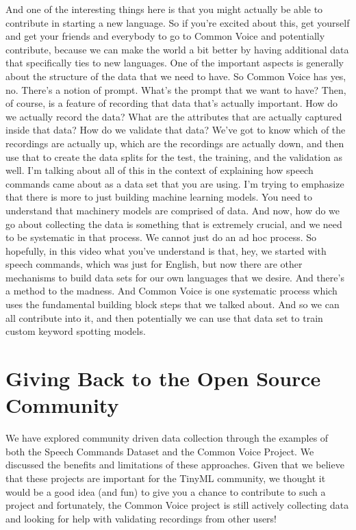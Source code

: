 And one of the interesting things here is
that you might actually be able to contribute in starting a new language.
So if you're excited about this, get yourself
and get your friends and everybody to go to Common Voice
and potentially contribute, because we can make the world a bit better
by having additional data that specifically ties to new languages.
One of the important aspects is generally
about the structure of the data that we need to have.
So Common Voice has yes, no.
There's a notion of prompt.
What's the prompt that we want to have?
Then, of course, is a feature of recording
that data that's actually important.
How do we actually record the data?
What are the attributes that are actually captured inside that data?
How do we validate that data?
We've got to know which of the recordings
are actually up, which are the recordings are actually down,
and then use that to create the data splits for the test, the training,
and the validation as well.
I'm talking about all of this in the context
of explaining how speech commands came about as a data set that you are using.
I'm trying to emphasize that there is more to just building machine learning
models.
You need to understand that machinery models are comprised of data.
And now, how do we go about collecting the data
is something that is extremely crucial, and we
need to be systematic in that process.
We cannot just do an ad hoc process.
So hopefully, in this video what you've understand is that, hey,
we started with speech commands, which was just for English,
but now there are other mechanisms to build data sets for our own languages
that we desire.
And there's a method to the madness.
And Common Voice is one systematic process
which uses the fundamental building block steps that we talked about.
And so we can all contribute into it, and then potentially we
can use that data set to train custom keyword spotting models.

\section{Giving Back to the Open Source Community}

We have explored community driven data collection through the examples of both the Speech Commands Dataset and the Common Voice Project. We discussed the benefits and limitations of these approaches. Given that we believe that these projects are important for the TinyML community, we thought it would be a good idea (and fun) to give you a chance to contribute to such a project and fortunately, the Common Voice project is still actively collecting data and looking for help with validating recordings from other users!

